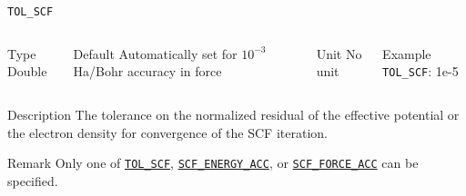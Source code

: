 \begin{frame}[allowframebreaks]{\texttt{TOL\_SCF}} \label{TOL_SCF}
\vspace*{-12pt}
\begin{columns}
\begin{block}{Type}
Double
\end{block}

\begin{block}{Default}
Automatically set for $10^{-3}$ Ha/Bohr accuracy in force
\end{block}

\begin{block}{Unit}
No unit
\end{block}

\begin{block}{Example}
\texttt{TOL\_SCF}: 1e-5
\end{block}
\end{columns}

\begin{block}{Description}
The tolerance on the normalized residual of the effective potential or the electron density for convergence of the SCF iteration. 
\end{block}

\begin{block}{Remark}
Only one of \hyperlink{TOL_SCF}{\texttt{TOL\_SCF}}, \hyperlink{SCF_ENERGY_ACC}{\texttt{SCF\_ENERGY\_ACC}}, or \hyperlink{SCF_FORCE_ACC}{\texttt{SCF\_FORCE\_ACC}} can be specified.
\end{block}

\end{frame}




